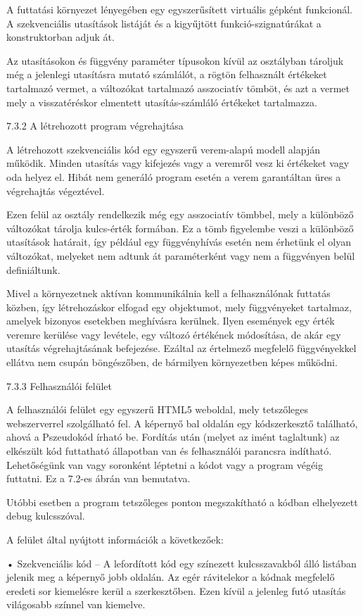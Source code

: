 A futtatási környezet lényegében egy egyszerűsített virtuális gépként funkcionál. A szekvenciális utasítások listáját és a kigyűjtött funkció-szignatúrákat a konstruktorban adjuk át.

Az utasításokon és függvény paraméter típusokon kívül az osztályban tároljuk még a jelenlegi utasításra mutató számlálót, a rögtön felhasznált értékeket tartalmazó vermet, a változókat tartalmazó asszociatív tömböt, és azt a vermet mely a visszatéréskor elmentett utasítás-számláló értékeket tartalmazza.

7.3.2 A létrehozott program végrehajtása

A létrehozott szekvenciális kód egy egyszerű verem-alapú modell alapján működik. Minden utasítás vagy kifejezés vagy a veremről vesz ki értékeket vagy oda helyez el. Hibát nem generáló program esetén a verem garantáltan üres a végrehajtás végeztével.

Ezen felül az osztály rendelkezik még egy asszociatív tömbbel, mely a különböző változókat tárolja kulcs-érték formában. Ez a tömb figyelembe veszi a különböző utasítások határait, így például egy függvényhívás esetén nem érhetünk el olyan változókat, melyeket nem adtunk át paraméterként vagy nem a függvényen belül definiáltunk.

Mivel a környezetnek aktívan kommunikálnia kell a felhasználónak futtatás közben, így létrehozáskor elfogad egy objektumot, mely függvényeket tartalmaz, amelyek bizonyos esetekben meghívásra kerülnek. Ilyen események egy érték veremre kerülése vagy levétele, egy változó értékének módosítása, de akár egy utasítás végrehajtásának befejezése. Ezáltal az értelmező megfelelő függvényekkel ellátva nem csupán böngészőben, de bármilyen környezetben képes működni.

7.3.3 Felhasználói felület

A felhasználói felület egy egyszerű HTML5 weboldal, mely tetszőleges webszerverrel szolgálható fel. A képernyő bal oldalán egy kódszerkesztő található, ahová a Pszeudokód írható be. Fordítás után (melyet az imént taglaltunk) az elkészült kód futtatható állapotban van és felhasználói parancsra indítható. Lehetőségünk van vagy soronként léptetni a kódot vagy a program végéig futtatni. Ez a 7.2-es ábrán van bemutatva.

Utóbbi esetben a program tetszőleges ponton megszakítható a kódban elhelyezett debug kulcsszóval.

A felület által nyújtott információk a következőek:

    • Szekvenciális kód – A lefordított kód egy színezett kulcsszavakból álló listában jelenik meg a képernyő jobb oldalán. Az egér rávitelekor a kódnak megfelelő eredeti sor kiemelésre kerül a szerkesztőben. Ezen kívül a jelenleg futó utasítás világosabb színnel van kiemelve.

